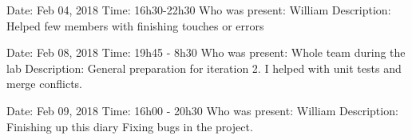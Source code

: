 \documentclass{article}
\begin{document}
    \vspace{2em}
    \begin{flushleft}
        Date: Feb 04, 2018 \newline
        Time: 16h30-22h30 \newline
        Who was present: William \newline
        Description: \newline
        Helped few members with finishing touches or errors \newline
    \end{flushleft}
    \vspace{2em}

    \begin{flushleft}
        Date: Feb 08, 2018 \newline
        Time: 19h45 - 8h30 \newline
        Who was present: Whole team during the lab \newline
        Description: \newline
        General preparation for iteration 2. \newline
        I helped with unit tests and merge conflicts. \newline
    \end{flushleft}
    \vspace{2em}

    \begin{flushleft}
        Date: Feb 09, 2018 \newline
        Time: 16h00 - 20h30 \newline
        Who was present: William \newline
        Description: \newline
        Finishing up this diary \newline
        Fixing bugs in the project. \newline
    \end{flushleft}
    \vspace{2em}
\end{document}
